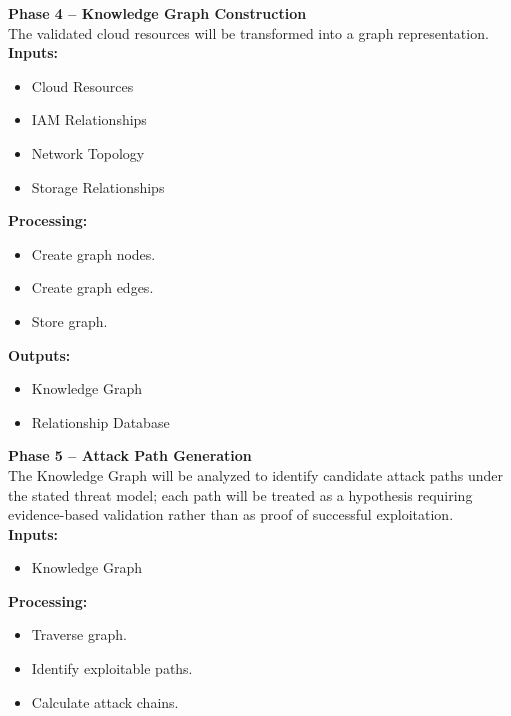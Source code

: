 \textbf{Phase 4 -- Knowledge Graph Construction}\\
The validated cloud resources will be transformed into a graph representation.\\
\textbf{Inputs:}

\begin{itemize}
\tightlist
\item
  Cloud Resources\\
\item
  IAM Relationships\\
\item
  Network Topology\\
\item
  Storage Relationships
\end{itemize}

\textbf{Processing:}

\begin{itemize}
\tightlist
\item
  Create graph nodes.\\
\item
  Create graph edges.\\
\item
  Store graph.
\end{itemize}

\textbf{Outputs:}

\begin{itemize}
\tightlist
\item
  Knowledge Graph\\
\item
  Relationship Database
\end{itemize}

\textbf{Phase 5 -- Attack Path Generation}\\
The Knowledge Graph will be analyzed to identify candidate attack paths under the stated threat model; each path will be treated as a hypothesis requiring evidence-based validation rather than as proof of successful exploitation.\\
\textbf{Inputs:}

\begin{itemize}
\tightlist
\item
  Knowledge Graph
\end{itemize}

\textbf{Processing:}

\begin{itemize}
\tightlist
\item
  Traverse graph.\\
\item
  Identify exploitable paths.\\
\item
  Calculate attack chains.
\end{itemize}

